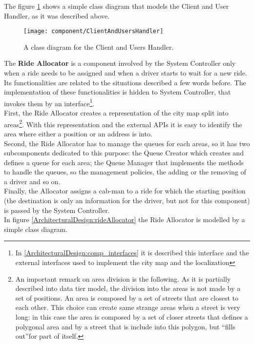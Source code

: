 \documentclass[\mainpath/main]{subfiles}
\begin{document}
The figure \ref{ArchitecturalDesign:clientAndUsersHandler} shows a simple class diagram that models the Client and User Handler, as it was described above.\\

\begin{figure}[h!]
	\centering
	\texttt{[image: component/ClientAndUsersHandler]}
	\caption{A class diagram for the Client and Users Handler.}
	\label{ArchitecturalDesign:clientAndUsersHandler}
\end{figure}

The \textbf{Ride Allocator} is a component involved by the System Controller only when a ride needs to be assigned and when a driver starts to wait for a new ride. Its functionalities are related to the situations described a few words before. The implementation of these functionalities is hidden to System Controller, that invokes them by an interface\footnote{In \autoref{ArchitecturalDesign:comp_interfaces} it is described this interface and the external interfaces used to implement the city map and the localization}.\\
First, the Ride Allocator creates a representation of the city map split into areas\footnote{An important remark on area division is the following. As it is partially described into data tier model, the division into the areas is not made by a set of positions. An area is composed by a set of streets that are closest to each other. This choice can create same strange areas when a street is very long: in this case the area is composed by a set of closer streets that defines a polygonal area and by a street that is include into this polygon, but \textquotedblleft fills out\textquotedblright for part of itself.}. With this representation and the external APIs it is easy to identify the area where either a position or an address is into.\\
Second, the Ride Allocator has to manage the queues for each areas, so it has two subcomponents dedicated to this purpose: the Queue Creator which creates and defines a queue for each area; the Queue Manager that implements the methods to handle the queues, so the management policies, the adding or the removing of a driver and so on.\\
Finally, the Allocator assigns a cab-man to a ride for which the starting position (the destination is only an information for the driver, but not for this component) is passed by the System Controller.\\
In figure \ref{ArchitecturalDesign:rideAllocator} the Ride Allocator is modelled by a simple class diagram.\\
\end{document}
